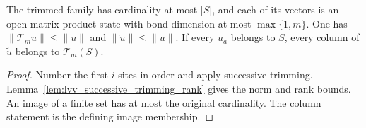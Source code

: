 \begin{lemma}
    \label{lem:lvv_bond_trimmed_family_bounds}
    \leanok
    The trimmed family has cardinality at most $|S|$, and each of its
    vectors is an open matrix product state with bond dimension at most
    $\max\{1,m\}$. One has $\|\mathcal T_m u\|\le\|u\|$ and
    $\|\widetilde u\|\le\|u\|$. If every $u_a$ belongs to $S$, every column
    of $\widetilde u$ belongs to $\mathcal T_m(S)$.
\end{lemma}
\begin{proof}
    \leanok
    Number the first $i$ sites in order and apply successive trimming.
    Lemma~\ref{lem:lvv_successive_trimming_rank} gives the norm and rank
    bounds. An image of a finite set has at most the original cardinality.
    The column statement is the defining image membership.
\end{proof}

